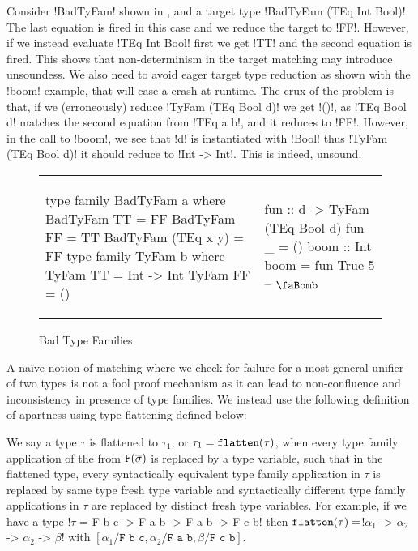 \documentclass[format=sigplan,manuscript,review,screen,nonacm,margin=1in]{acmart}
\begin{document}
Consider !BadTyFam! shown in , and a target type
!BadTyFam (TEq Int Bool)!. The last equation is fired in this case and we reduce the target to !FF!.
However, if we instead evaluate !TEq Int Bool! first we get !TT! and the second equation is fired.
This shows that non-determinism in the target matching may introduce unsoundess.
We also need to avoid eager target type reduction as shown with the !boom! example,
that will case a crash at runtime. The crux of the problem is that, if we (erroneously) reduce
!TyFam (TEq Bool d)! we get !()!, as !TEq Bool d! matches the second equation from !TEq a b!,
and it reduces to !FF!. However, in the call to !boom!, we see that !d! is instantiated with !Bool!
thus !TyFam (TEq Bool d)! it should reduce to !Int -> Int!. This is indeed, unsound.
\begin{figure}[ht]
  \begin{tabular}{l l}
\begin{code}
type family BadTyFam a where
  BadTyFam TT        = FF
  BadTyFam FF        = TT
  BadTyFam (TEq x y) = FF
type family TyFam b where
  TyFam TT = Int -> Int
  TyFam FF = ()
\end{code}&%
\begin{code}
fun :: d -> TyFam (TEq Bool d)
fun _ = ()
boom :: Int
boom = fun True 5 -- $\text{\faBomb}$
\end{code}
  \end{tabular}
  \caption{Bad Type Families}
  \label{fig:closed-tf-bad}
\end{figure}
A na\"ive notion of matching where we check for failure for a most general unifier of two types
is not a fool proof mechanism as it can lead to non-confluence and inconsistency in presence of type families.
We instead use the following definition of apartness using type flattening defined below:
\begin{defn}\label{def:ctf-flatten}
  We say a type $\tau$ is flattened to $\tau_1$, or $\tau_1 = \texttt{flatten}(\tau)$, when every
  type family application of the from $\texttt{F}(\overline{\sigma})$ is replaced by a type variable,
  such that in the flattened type, every syntactically equivalent type family application
  in $\tau$ is replaced by same type fresh type variable and syntactically different type family applications in $\tau$
  are replaced by distinct fresh type variables. For example, if we have a type !$\tau$ = F b c -> F a b -> F a b -> F c b!
  then $\texttt{flatten}(\tau) =$!$\alpha_1$ -> $\alpha_2$ -> $\alpha_2$ -> $\beta$!
  with $[\alpha_1/\texttt{F b c}, \alpha_2/\texttt{F a b}, \beta/\texttt{F c b}]$.
\end{defn}
\end{document}
